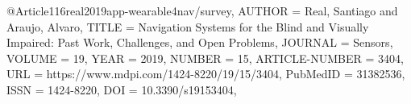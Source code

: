 @Article{116real2019app-wearable4nav/survey,
AUTHOR = {Real, Santiago and Araujo, Alvaro},
TITLE = {Navigation Systems for the Blind and Visually Impaired: Past Work, Challenges, and Open Problems},
JOURNAL = {Sensors},
VOLUME = {19},
YEAR = {2019},
NUMBER = {15},
ARTICLE-NUMBER = {3404},
URL = {https://www.mdpi.com/1424-8220/19/15/3404},
PubMedID = {31382536},
ISSN = {1424-8220},
DOI = {10.3390/s19153404},}